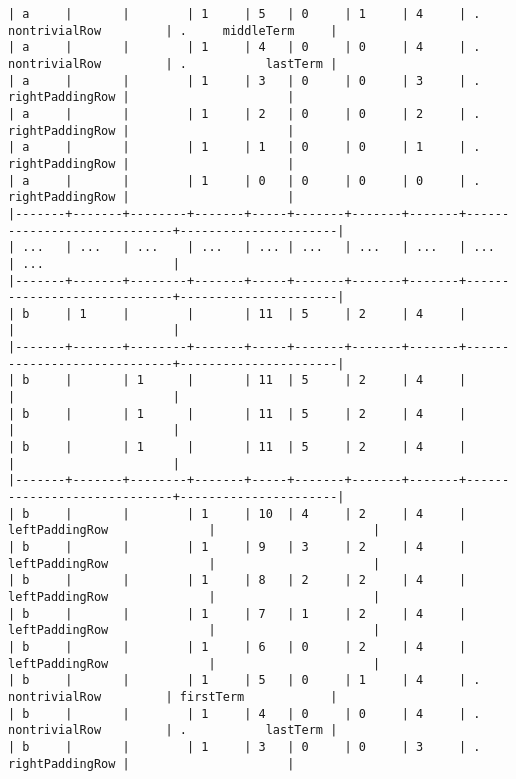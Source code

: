 \documentclass[varwidth=\maxdimen,margin=0.5cm,multi={verbatim}]{standalone}
\begin{document}
\begin{verbatim}
| a     |       |        | 1     | 5   | 0     | 1     | 4     | .     nontrivialRow         | .     middleTerm     |
| a     |       |        | 1     | 4   | 0     | 0     | 4     | .     nontrivialRow         | .           lastTerm |
| a     |       |        | 1     | 3   | 0     | 0     | 3     | .           rightPaddingRow |                      |
| a     |       |        | 1     | 2   | 0     | 0     | 2     | .           rightPaddingRow |                      |
| a     |       |        | 1     | 1   | 0     | 0     | 1     | .           rightPaddingRow |                      |
| a     |       |        | 1     | 0   | 0     | 0     | 0     | .           rightPaddingRow |                      |
|-------+-------+--------+-------+-----+-------+-------+-------+-----------------------------+----------------------|
| ...   | ...   | ...    | ...   | ... | ...   | ...   | ...   | ...                         | ...                  |
|-------+-------+--------+-------+-----+-------+-------+-------+-----------------------------+----------------------|
| b     | 1     |        |       | 11  | 5     | 2     | 4     |                             |                      |
|-------+-------+--------+-------+-----+-------+-------+-------+-----------------------------+----------------------|
| b     |       | 1      |       | 11  | 5     | 2     | 4     |                             |                      |
| b     |       | 1      |       | 11  | 5     | 2     | 4     |                             |                      |
| b     |       | 1      |       | 11  | 5     | 2     | 4     |                             |                      |
|-------+-------+--------+-------+-----+-------+-------+-------+-----------------------------+----------------------|
| b     |       |        | 1     | 10  | 4     | 2     | 4     | leftPaddingRow              |                      |
| b     |       |        | 1     | 9   | 3     | 2     | 4     | leftPaddingRow              |                      |
| b     |       |        | 1     | 8   | 2     | 2     | 4     | leftPaddingRow              |                      |
| b     |       |        | 1     | 7   | 1     | 2     | 4     | leftPaddingRow              |                      |
| b     |       |        | 1     | 6   | 0     | 2     | 4     | leftPaddingRow              |                      |
| b     |       |        | 1     | 5   | 0     | 1     | 4     | .     nontrivialRow         | firstTerm            |
| b     |       |        | 1     | 4   | 0     | 0     | 4     | .     nontrivialRow         | .           lastTerm |
| b     |       |        | 1     | 3   | 0     | 0     | 3     | .           rightPaddingRow |                      |

\end{verbatim}
\end{document}
